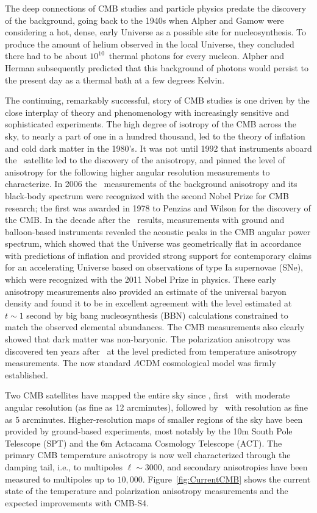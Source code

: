 The deep connections of CMB studies and particle physics predate the discovery of the background, going back to the 1940s when Alpher and Gamow were considering a hot, dense, early Universe as a possible site for nucleosynthesis. To produce the
amount of helium observed in the local Universe, they concluded there
had to be about $10^{10}$\ thermal photons for every nucleon. Alpher and Herman subsequently predicted that this background of photons would persist to the present day as a thermal bath at a few degrees Kelvin.

The continuing, remarkably successful, story of CMB studies is one driven by the close interplay of theory and phenomenology with increasingly sensitive and sophisticated experiments. The high degree of isotropy of the CMB across the sky, to nearly a part of one in a hundred thousand, led to the theory of inflation and cold dark matter in the 1980's. It was not until 1992 that instruments aboard the \cobe\ satellite led to the discovery of the anisotropy, and pinned the level of anisotropy for the following higher angular resolution measurements to characterize. In 2006 the \cobe\ measurements of the background anisotropy and its black-body spectrum were recognized with the second Nobel Prize for CMB research; the first was awarded in 1978 to Penzias and Wilson for the discovery of the CMB.  In the decade after the \cobe\ results, measurements with ground and balloon-based instruments revealed the acoustic peaks in the CMB angular power spectrum, which showed that the Universe was geometrically flat in accordance with predictions of inflation and provided strong support for contemporary claims for an accelerating Universe based on observations of type Ia supernovae (SNe), which were recognized with the 2011 Nobel Prize in physics. These early anisotropy measurements also provided an estimate of the universal baryon density and found it to be in excellent agreement with the level estimated at $t \sim 1$ second by big bang nucleosynthesis (BBN) calculations constrained to match the observed elemental abundances. The CMB measurements also clearly showed that dark matter was non-baryonic. The polarization anisotropy was discovered ten years after \cobe\ at the level predicted from temperature anisotropy measurements. The now standard $\Lambda$CDM cosmological model was firmly established.

Two CMB satellites have mapped the entire sky since \cobe, first \wmap\ with moderate angular resolution (as fine as 12 arcminutes), followed by \planck\ with resolution as fine as 5 arcminutes. Higher-resolution maps of smaller regions of the sky have been provided by ground-based experiments, most notably by the 10m South Pole Telescope (SPT) and the 6m Actacama Cosmology Telescope (ACT). The primary CMB temperature anisotropy is now well characterized through the damping tail, i.e., to multipoles $\ell \sim 3000$, and secondary anisotropies have been measured to multipoles up to  $10,000$.  Figure~\ref{fig:CurrentCMB} shows the current state of the temperature and polarization anisotropy measurements and the expected improvements with CMB-S4.


